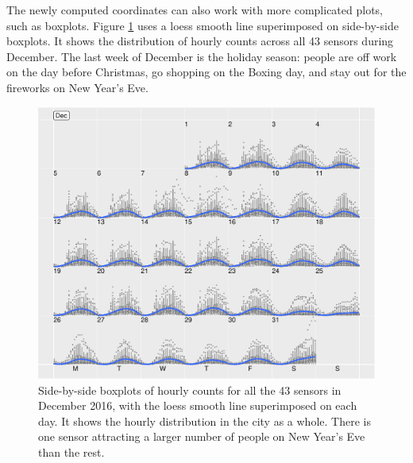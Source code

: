 \documentclass[article]{jss}
\theoremstyle{definition}
\theoremstyle{definition}
\theoremstyle{remark}
\begin{document}
The newly computed coordinates can also work with more complicated
plots, such as boxplots. Figure \ref{fig:boxplot} uses a loess smooth
line superimposed on side-by-side boxplots. It shows the distribution of
hourly counts across all 43 sensors during December. The last week of
December is the holiday season: people are off work on the day before
Christmas, go shopping on the Boxing day, and stay out for the fireworks
on New Year's Eve.

\begin{CodeChunk}
\begin{figure}

{\centering \includegraphics[width=\textwidth]{figure/boxplot-1} 

}

\caption[Side-by-side boxplots of hourly counts for all the 43
sensors in December 2016, with the loess smooth line superimposed on
each day. It shows the hourly distribution in the city as a whole. There
is one sensor attracting a larger number of people on New Year's Eve
than the rest.]{Side-by-side boxplots of hourly counts for all the 43
sensors in December 2016, with the loess smooth line superimposed on
each day. It shows the hourly distribution in the city as a whole. There
is one sensor attracting a larger number of people on New Year's Eve
than the rest.}\label{fig:boxplot}
\end{figure}
\end{CodeChunk}
\end{document}
